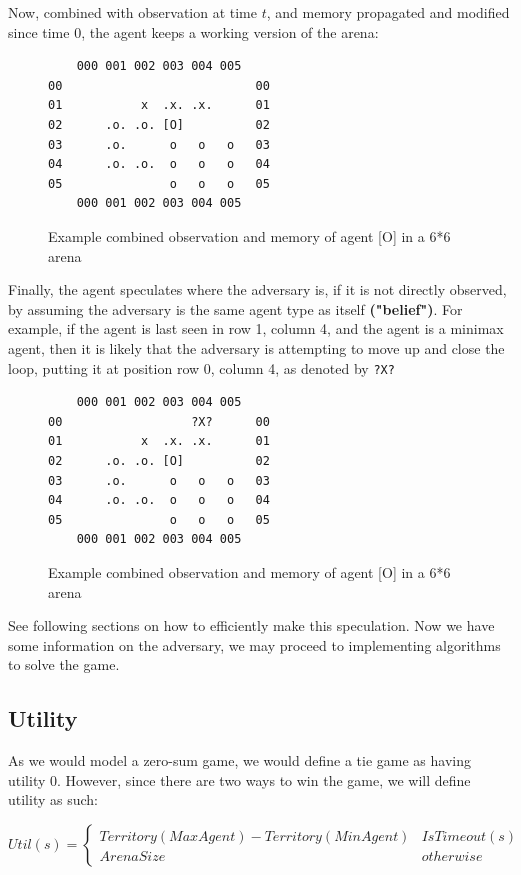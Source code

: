 \documentclass{article}
\begin{document}
Now, combined with observation at time $t$, and memory propagated and modified since time 0, the agent keeps a working version of the arena:

\begin{figure}[h!]
\centering
\begin{BVerbatim}
    000 001 002 003 004 005
00                           00
01           x  .x. .x.      01
02      .o. .o. [O]          02
03      .o.      o   o   o   03
04      .o. .o.  o   o   o   04
05               o   o   o   05
    000 001 002 003 004 005
\end{BVerbatim}
\caption{Example combined observation and memory of agent [O] in a 6*6 arena}
\end{figure}

Finally, the agent speculates where the adversary is, if it is not directly observed, by assuming the adversary is the same agent type as itself \textbf{("belief")}. For example, if the agent is last seen in row 1, column 4, and the agent is a minimax agent, then it is likely that the adversary is attempting to move up and close the loop, putting it at position row 0, column 4, as denoted by \texttt{?X?}

\begin{figure}[h!]
\centering
\begin{BVerbatim}
    000 001 002 003 004 005
00                  ?X?      00
01           x  .x. .x.      01
02      .o. .o. [O]          02
03      .o.      o   o   o   03
04      .o. .o.  o   o   o   04
05               o   o   o   05
    000 001 002 003 004 005
\end{BVerbatim}
\caption{Example combined observation and memory of agent [O] in a 6*6 arena}
\end{figure}

See following sections on how to efficiently make this speculation. Now we have some information on the adversary, we may proceed to implementing algorithms to solve the game.

\subsection{Utility}

As we would model a zero-sum game, we would define a tie game as having utility 0. However, since there are two ways to win the game, we will define utility as such:

\[
Util(s)
=
\begin{cases}
    Territory(MaxAgent) - Territory(MinAgent) & IsTimeout(s)\\
    ArenaSize & otherwise
\end{cases}
\]
\end{document}
